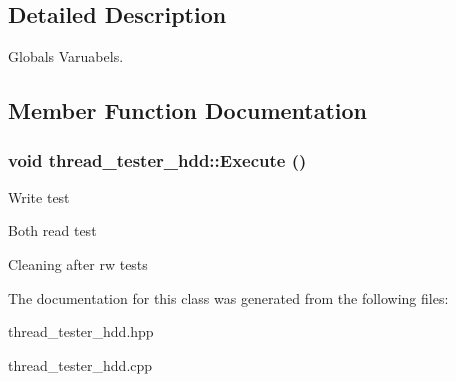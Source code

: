 \subsection{Detailed Description}
Globals Varuabels. 

\subsection{Member Function Documentation}
\hypertarget{classthread__tester__hdd_a9d9f6f67783301bb7d1b9859ecd932c0}{
\subsubsection[{Execute}]{\setlength{\rightskip}{0pt plus 5cm}void thread\_\-tester\_\-hdd::Execute ()}}
\label{classthread__tester__hdd_a9d9f6f67783301bb7d1b9859ecd932c0}


Write test

Both read test

Cleaning after rw tests 



The documentation for this class was generated from the following files:\begin{DoxyCompactItemize}
\item 
thread\_\-tester\_\-hdd.hpp\item 
thread\_\-tester\_\-hdd.cpp\end{DoxyCompactItemize}

